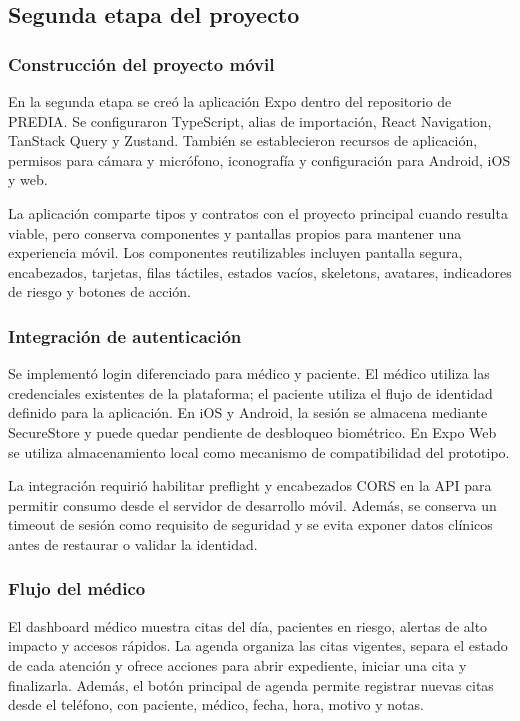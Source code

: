 \documentclass[12pt,letterpaper]{report}
\newcommand{\projectname}{PREDIA}
\begin{document}
\subsection{Segunda etapa del proyecto}

\subsubsection{Construcción del proyecto móvil}

En la segunda etapa se creó la aplicación Expo dentro del repositorio de \projectname. Se configuraron TypeScript, alias de importación, React Navigation, TanStack Query y Zustand. También se establecieron recursos de aplicación, permisos para cámara y micrófono, iconografía y configuración para Android, iOS y web.

La aplicación comparte tipos y contratos con el proyecto principal cuando resulta viable, pero conserva componentes y pantallas propios para mantener una experiencia móvil. Los componentes reutilizables incluyen pantalla segura, encabezados, tarjetas, filas táctiles, estados vacíos, skeletons, avatares, indicadores de riesgo y botones de acción.

\subsubsection{Integración de autenticación}

Se implementó login diferenciado para médico y paciente. El médico utiliza las credenciales existentes de la plataforma; el paciente utiliza el flujo de identidad definido para la aplicación. En iOS y Android, la sesión se almacena mediante SecureStore y puede quedar pendiente de desbloqueo biométrico. En Expo Web se utiliza almacenamiento local como mecanismo de compatibilidad del prototipo.

La integración requirió habilitar preflight y encabezados CORS en la API para permitir consumo desde el servidor de desarrollo móvil. Además, se conserva un timeout de sesión como requisito de seguridad y se evita exponer datos clínicos antes de restaurar o validar la identidad.

\subsubsection{Flujo del médico}

El dashboard médico muestra citas del día, pacientes en riesgo, alertas de alto impacto y accesos rápidos. La agenda organiza las citas vigentes, separa el estado de cada atención y ofrece acciones para abrir expediente, iniciar una cita y finalizarla. Además, el botón principal de agenda permite registrar nuevas citas desde el teléfono, con paciente, médico, fecha, hora, motivo y notas.
\end{document}
